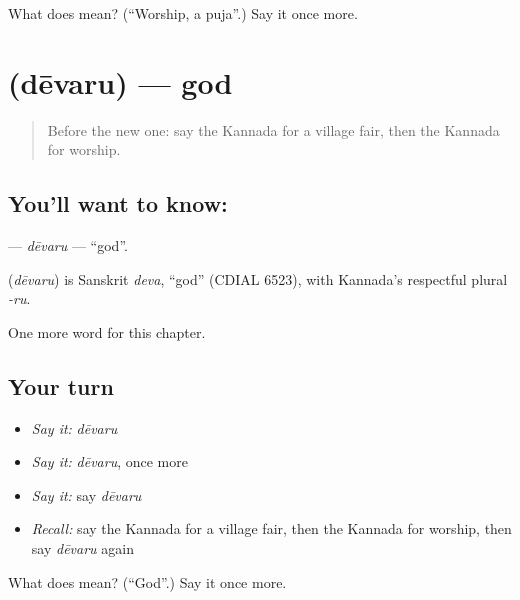 \begin{tcolorbox}[breakable,colback=teal!4,colframe=teal!35!black,title={Before you move on}]
What does  mean? (\textquotedblleft{}Worship, a puja\textquotedblright{}.) Say it once more.
\end{tcolorbox}
\section[\texorpdfstring{\kn{ದೇವರು} (dēvaru)}{ದೇವರು (dēvaru)}]{ (dēvaru) — god}

\label{lesson:KA-C189-devaru}



\begin{quote}
Before the new one: say the Kannada for a village fair, then the Kannada for worship.
\end{quote}

\subsection*{You'll want to know: }
\textbf{} — \emph{dēvaru} — \textquotedblleft{}god\textquotedblright{}.

\begin{cousinweb}
\textbf{} (\emph{dēvaru}) is Sanskrit \emph{deva}, \textquotedblleft{}god\textquotedblright{} (CDIAL 6523), with Kannada's respectful plural \emph{-ru}.
\end{cousinweb}

\begin{grammarlens}[title={What you've built}]
One more word for this chapter.
\end{grammarlens}

\subsection*{Your turn}
\begin{itemize}
\raggedright
  \item \emph{Say it:} \emph{dēvaru}
  \item \emph{Say it:} \emph{dēvaru}, once more
  \item \emph{Say it:} say \emph{dēvaru}
  \item \emph{Recall:} say the Kannada for a village fair, then the Kannada for worship, then say \emph{dēvaru} again
\end{itemize}

\begin{tcolorbox}[breakable,colback=teal!4,colframe=teal!35!black,title={Before you move on}]
What does  mean? (\textquotedblleft{}God\textquotedblright{}.) Say it once more.
\end{tcolorbox}
